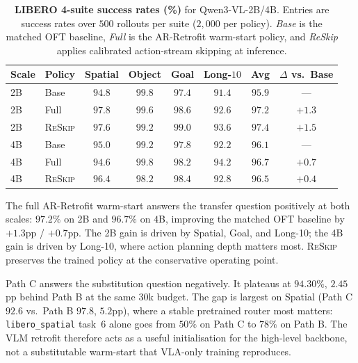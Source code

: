 \documentclass{article}
\newcommand{\reskip}{\textsc{ReSkip}}
\begin{document}
\begin{table}[t]
\caption{\textbf{LIBERO 4-suite success rates (\%)} for Qwen3-VL-2B/4B. Entries are success rates over $500$ rollouts per suite ($2{,}000$ per policy). \emph{Base} is the matched OFT baseline, \emph{Full} is the AR-Retrofit warm-start policy, and \emph{ReSkip} applies calibrated action-stream skipping at inference.}
\label{tab:vla_libero}
\centering\small
\setlength{\tabcolsep}{4pt}
\begin{tabular}{llcccccc}
\toprule
Scale & Policy & Spatial & Object & Goal & Long-$10$ & \textbf{Avg} & $\Delta$ vs.\ Base \\
\midrule
2B & Base               & $94.8$ & $99.8$ & $97.4$ & $91.4$ & $95.9$ & --- \\
2B & Full               & $\mathbf{97.8}$ & $99.6$ & $98.6$ & $92.6$ & $97.2$ & $\mathbf{+1.3}$ \\
2B & \reskip{}          & $97.6$ & $99.2$ & $\mathbf{99.0}$ & $\mathbf{93.6}$ & $\mathbf{97.4}$ & $\mathbf{+1.5}$ \\
\midrule
4B & Base               & $95.0$ & $99.2$ & $97.8$ & $92.2$ & $96.1$ & --- \\
4B & Full               & $94.6$ & $\mathbf{99.8}$ & $98.2$ & $\mathbf{94.2}$ & $\mathbf{96.7}$ & $\mathbf{+0.7}$ \\
4B & \reskip{}          & $\mathbf{96.4}$ & $98.2$ & $\mathbf{98.4}$ & $92.8$ & $96.5$ & $+0.4$ \\
\bottomrule
\end{tabular}
\end{table}

The full AR-Retrofit warm-start answers the transfer question positively at both scales: $97.2\%$ on $2$B and $96.7\%$ on $4$B, improving the matched OFT baseline by $+1.3$pp / $+0.7$pp. The 2B gain is driven by Spatial, Goal, and Long-10; the 4B gain is driven by Long-10, where action planning depth matters most. \reskip{} preserves the trained policy at the conservative operating point.

Path C answers the substitution question negatively. It plateaus at $94.30\%$, $2.45$pp behind Path B at the same $30$k budget. The gap is largest on Spatial (Path C $92.6$ vs.\ Path B $97.8$, $5.2$pp), where a stable pretrained router most matters: \texttt{libero\_spatial} task~$6$ alone goes from $50\%$ on Path C to $78\%$ on Path B. The VLM retrofit therefore acts as a useful initialisation for the high-level backbone, not a substitutable warm-start that VLA-only training reproduces.
\end{document}
